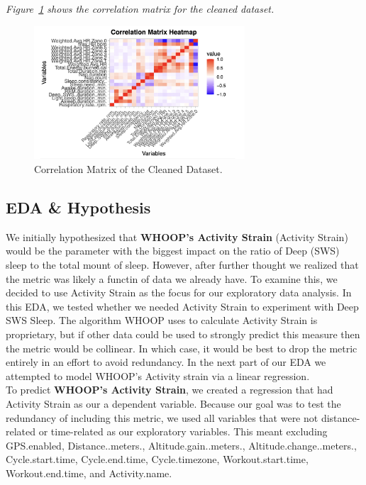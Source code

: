 \documentclass{article}
\begin{document}
\textit{Figure~\ref{fig:correlation-matrix-cleaned} shows the correlation matrix for the cleaned dataset.}

\begin{figure}[h!]
  \centering
  \includegraphics[width=0.7\textwidth]{images/cleanedcorrelation.png}
  \caption{Correlation Matrix of the Cleaned Dataset.}
  \label{fig:correlation-matrix-cleaned}
\end{figure}

\newpage

\subsection{ \hspace{0.5em} \hspace{0.5em} EDA \& Hypothesis}

We initially hypothesized that \textbf{WHOOP's Activity Strain} (Activity Strain) would be the parameter with the biggest impact on the ratio of Deep (SWS) sleep to the total mount of sleep. However, after further thought we realized that the metric was likely a functin of data we already have. To examine this, we decided to use Activity Strain as the focus for our exploratory data analysis. In this EDA, we tested whether we needed Activity Strain to experiment with Deep SWS Sleep. The algorithm WHOOP uses to calculate Activity Strain is proprietary, but if other data could be used to strongly predict this measure then the metric would be collinear. In which case, it would be best to drop the metric entirely in an effort to avoid redundancy. In the next part of our EDA we attempted to model WHOOP's Activity strain via a linear regression. \\

To predict \textbf{WHOOP's Activity Strain}, we created a regression that had Activity Strain as our a dependent variable. Because our goal was to test the redundancy of including this metric, we used all variables that were not distance-related or time-related as our exploratory variables. This meant excluding GPS.enabled, Distance..meters., Altitude.gain..meters., Altitude.change..meters., Cycle.start.time, Cycle.end.time, Cycle.timezone, Workout.start.time, Workout.end.time, and Activity.name. \\
\end{document}
